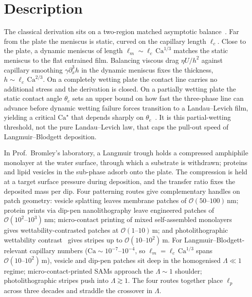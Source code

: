 \documentclass[11pt]{article}
\begin{document}
\section*{Description}

The classical derivation sits on a two-region matched asymptotic balance~\citep{landauLevich1942, quere1999fluid, rioBoulogne2017}. Far from the plate the meniscus is static, curved on the capillary length $\ell_c$. Close to the plate, a dynamic meniscus of length $\ell_m \sim \ell_c \, \mathrm{Ca}^{1/3}$ matches the static meniscus to the flat entrained film. Balancing viscous drag $\eta U / h^2$ against capillary smoothing $\gamma \partial_x^3 h$ in the dynamic meniscus fixes the thickness, $h \sim \ell_c \, \mathrm{Ca}^{2/3}$. On a completely wetting plate the contact line carries no additional stress and the derivation is closed. On a partially wetting plate the static contact angle $\theta_e$ sets an upper bound on how fast the three-phase line can advance before dynamic wetting failure forces transition to a Landau--Levich film, yielding a critical $\mathrm{Ca}^\star$ that depends sharply on $\theta_e$~\citep{eggers2004,snoeijerWetting2006,snoeijer2008,bonnWettingSpreading2009}. It is this partial-wetting threshold, not the pure Landau--Levich law, that caps the pull-out speed of Langmuir--Blodgett deposition.

In Prof.~Bromley's laboratory, a Langmuir trough holds a compressed amphiphile monolayer at the water surface, through which a substrate is withdrawn; proteins and lipid vesicles in the sub-phase adsorb onto the plate. The compression is held at a target surface pressure during deposition, and the transfer ratio fixes the deposited mass per dip. Four patterning routes give complementary handles on patch geometry: vesicle splatting leaves membrane patches of $\mathcal{O}(50\text{--}100)$\,nm; protein prints via dip-pen nanolithography leave engineered patches of $\mathcal{O}(10^2\text{--}10^3)$\,nm; micro-contact printing of mixed self-assembled monolayers~\citep{wilbur1994,mrksich1995} gives wettability-contrasted patches at $\mathcal{O}(1\text{--}10)$\,\micro m; and photolithographic wettability contrast~\citep{darhuber2000} gives stripes up to $\mathcal{O}(10\text{--}10^2)$\,\micro m. For Langmuir--Blodgett-relevant capillary numbers ($\mathrm{Ca} \sim 10^{-7}$--$10^{-4}$, so $\ell_m = \ell_c \, \mathrm{Ca}^{1/3}$ spans $\mathcal{O}(10\text{--}10^2)$\,\micro m), vesicle and dip-pen patches sit deep in the homogenised $\Lambda \ll 1$ regime; micro-contact-printed SAMs approach the $\Lambda \sim 1$ shoulder; photolithographic stripes push into $\Lambda \gtrsim 1$. The four routes together place $\ell_p$ across three decades and straddle the crossover in $\Lambda$.
\end{document}
